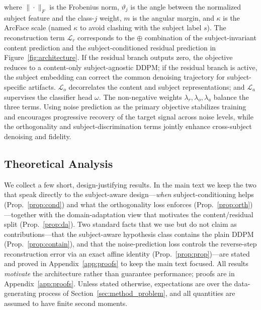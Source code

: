 where $\|\cdot\|_F$ is the Frobenius norm, $\vartheta_j$ is the angle between the
normalized subject feature and the class-$j$ weight, $m$ is the angular margin,
and $\kappa$ is the ArcFace scale (named $\kappa$ to avoid clashing with the
subject label $s$). The reconstruction term $\mathcal{L}_r$ corresponds to the
$\oplus$ combination of the subject-invariant content prediction and the
subject-conditioned residual prediction in Figure~\ref{fig:architecture}. If the
residual branch outputs zero, the objective reduces to a content-only
subject-agnostic DDPM; if the residual branch is active, the subject embedding
can correct the common denoising trajectory for subject-specific artifacts.
$\mathcal{L}_o$ decorrelates the content and subject representations; and
$\mathcal{L}_a$ supervises the classifier head $\omega$. The non-negative weights
$\lambda_r,\lambda_o,\lambda_a$ balance the three terms. Using noise prediction as
the primary objective stabilizes training and encourages progressive recovery of
the target signal across noise levels, while the orthogonality and
subject-discrimination terms jointly enhance cross-subject denoising and fidelity.

\subsection{Theoretical Analysis}
\label{sec:method_theory}

We collect a few short, design-justifying results. In the main text we keep the
two that speak directly to the subject-aware design---\emph{when}
subject-conditioning helps (Prop.~\ref{prop:cond}) and what the orthogonality loss
enforces (Prop.~\ref{prop:orth})---together with the domain-adaptation view that
motivates the content/residual split (Prop.~\ref{prop:da}). Two standard facts
that we use but do not claim as contributions---that the subject-aware hypothesis
class contains the plain DDPM (Prop.~\ref{prop:contain}), and that the
noise-prediction loss controls the reverse-step reconstruction error via an exact
affine identity (Prop.~\ref{prop:prop})---are stated and proved in
Appendix~\ref{app:proofs} to keep the main text focused. All results
\emph{motivate} the architecture rather than guarantee performance; proofs are in
Appendix~\ref{app:proofs}. Unless stated otherwise, expectations are over the
data-generating process of Section~\ref{sec:method_problem}, and all quantities
are assumed to have finite second moments.

